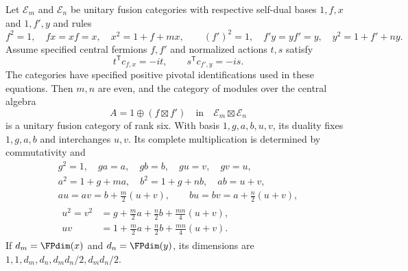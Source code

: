 \begin{theorem}\label{thm:fermionic-product}
Let $\mathcal E_m$ and $\mathcal E_n$ be unitary fusion categories with
respective self-dual bases $1,f,x$ and $1,f',y$ and rules
\[
 f^2=1,\quad fx=xf=x,\quad x^2=1+f+mx,
\qquad
 (f')^2=1,\quad f'y=yf'=y,\quad y^2=1+f'+ny.
\]
Assume specified central fermions $f,f'$ and normalized actions $t,s$
satisfy
\begin{equation}\label{eq:two-fermion-phases}
 t^{\mathsf T}c_{f,x}=-it,\qquad
 s^{\mathsf T}c_{f',y}=-is.
\end{equation}
The categories have specified positive pivotal identifications used in
these equations. Then $m,n$ are even, and the category of modules over
the central algebra
\[
 A=1\oplus(f\boxtimes f')\quad\text{in}\quad
 \mathcal E_m\boxtimes\mathcal E_n
\]
is a unitary fusion category of rank six. With basis $1,g,a,b,u,v$,
its duality fixes $1,g,a,b$ and interchanges $u,v$. Its complete
multiplication is determined by commutativity and
\begin{gather}
 g^2=1,\quad ga=a,\quad gb=b,\quad gu=v,\quad gv=u,
 \label{eq:ferm-product-1}\\
 a^2=1+g+ma,\quad b^2=1+g+nb,\quad ab=u+v,
 \label{eq:ferm-product-2}\\
 au=av=b+\tfrac m2(u+v),\qquad bu=bv=a+\tfrac n2(u+v),
 \label{eq:ferm-product-3}\\
 \begin{aligned}
 u^2=v^2&=g+\tfrac m2a+\tfrac n2b+\tfrac{mn}{4}(u+v),\\
 uv&=1+\tfrac m2a+\tfrac n2b+\tfrac{mn}{4}(u+v).
 \end{aligned}\label{eq:ferm-product-4}
\end{gather}
If $d_m=\FPdim(x)$ and $d_n=\FPdim(y)$, its dimensions are
$1,1,d_m,d_n,d_md_n/2,d_md_n/2$.
\end{theorem}
